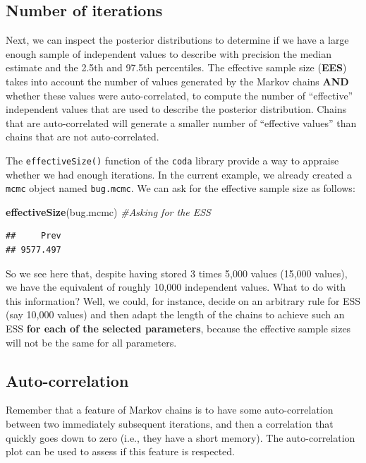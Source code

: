 \documentclass[
]{book}
\newenvironment{Shaded}{\begin{snugshade}}{\end{snugshade}}
\newcommand{\CommentTok}[1]{\textcolor[rgb]{0.56,0.35,0.01}{\textit{#1}}}
\newcommand{\FunctionTok}[1]{\textcolor[rgb]{0.13,0.29,0.53}{\textbf{#1}}}
\newcommand{\NormalTok}[1]{#1}
\begin{document}
\subsection{Number of iterations}\label{number-of-iterations}

Next, we can inspect the posterior distributions to determine if we have a large enough sample of independent values to describe with precision the median estimate and the 2.5th and 97.5th percentiles. The effective sample size (\textbf{EES}) takes into account the number of values generated by the Markov chains \textbf{AND} whether these values were auto-correlated, to compute the number of ``effective'' independent values that are used to describe the posterior distribution. Chains that are auto-correlated will generate a smaller number of ``effective values'' than chains that are not auto-correlated.

The \texttt{effectiveSize()} function of the \texttt{coda} library provide a way to appraise whether we had enough iterations. In the current example, we already created a \texttt{mcmc} object named \texttt{bug.mcmc}. We can ask for the effective sample size as follows:

\begin{Shaded}
\begin{Highlighting}[]
\FunctionTok{effectiveSize}\NormalTok{(bug.mcmc)         }\CommentTok{\#Asking for the ESS}
\end{Highlighting}
\end{Shaded}

\begin{verbatim}
##     Prev 
## 9577.497
\end{verbatim}

So we see here that, despite having stored 3 times 5,000 values (15,000 values), we have the equivalent of roughly 10,000 independent values. What to do with this information? Well, we could, for instance, decide on an arbitrary rule for ESS (say 10,000 values) and then adapt the length of the chains to achieve such an ESS \textbf{for each of the selected parameters}, because the effective sample sizes will not be the same for all parameters.

\subsection{Auto-correlation}\label{auto-correlation}

Remember that a feature of Markov chains is to have some auto-correlation between two immediately subsequent iterations, and then a correlation that quickly goes down to zero (i.e., they have a short memory). The auto-correlation plot can be used to assess if this feature is respected.
\end{document}
